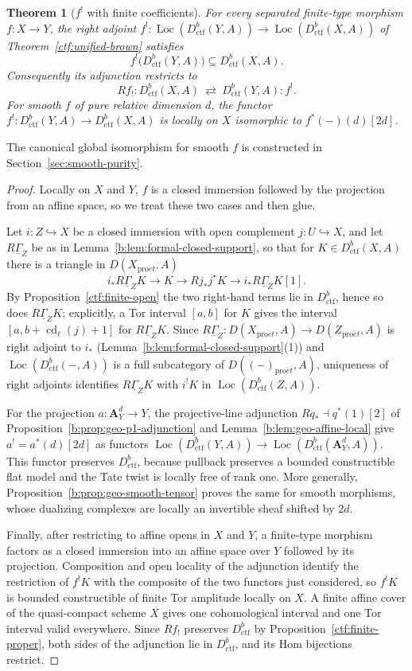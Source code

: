 \documentclass[11pt,a4paper]{article}
\numberwithin{equation}{section}
\newtheorem{theorem}{Theorem}[section]
\theoremstyle{definition}
\theoremstyle{remark}
\newcommand{\Loc}{\operatorname{Loc}}
\newcommand{\proet}{\mathrm{pro}\acute{e}t}
\newcommand{\Dctf}{D^b_{\mathrm{ctf}}}
\begin{document}
\begin{theorem}[$f^!$ with finite coefficients]
\label{ctf:finite-restriction}
For every separated finite-type morphism $f:X\to Y$, the right adjoint
$f^!\colon\Loc(\Dctf(Y,A))\to\Loc(\Dctf(X,A))$ of
Theorem~\ref{ctf:unified-brown} satisfies
\[
 f^!\bigl(\Dctf(Y,A)\bigr)\subseteq\Dctf(X,A).
\]
Consequently its adjunction restricts to
\[
 Rf_!:\Dctf(X,A)\ \rightleftarrows\ \Dctf(Y,A):f^!.
\]
For smooth $f$ of pure relative dimension $d$, the functor
$f^!\colon\Dctf(Y,A)\to\Dctf(X,A)$ is locally on $X$ isomorphic to
$f^*(-)(d)[2d]$.
\end{theorem}

The canonical global isomorphism for smooth $f$ is constructed in
Section~\ref{sec:smooth-purity}.

\begin{proof}
Locally on $X$ and $Y$, $f$ is a closed immersion followed by the
projection from an affine space, so we treat these two cases and then
glue.

Let $i:Z\hookrightarrow X$ be a closed immersion with open
complement $j:U\hookrightarrow X$, and let $R\underline\Gamma_Z$ be as in
Lemma~\ref{b:lem:formal-closed-support}, so that for
$K\in\Dctf(X,A)$ there is a triangle in $D(X_{\proet},A)$
\[
 i_*R\underline\Gamma_ZK\longrightarrow K\longrightarrow Rj_*j^*K
       \longrightarrow i_*R\underline\Gamma_ZK[1].
\]
By Proposition~\ref{ctf:finite-open} the two right-hand terms lie in
$\Dctf$, hence so does $R\underline\Gamma_ZK$; explicitly, a Tor interval
$[a,b]$ for $K$ gives the interval
$[a,b+\operatorname{cd}_\ell(j)+1]$ for $R\underline\Gamma_ZK$. Since
$R\underline\Gamma_Z\colon D(X_{\proet},A)\to D(Z_{\proet},A)$ is right
adjoint to $i_*$ (Lemma~\ref{b:lem:formal-closed-support}(1)) and
$\Loc(\Dctf(-,A))$ is a full subcategory of $D((-)_{\proet},A)$,
uniqueness of right adjoints identifies $R\underline\Gamma_ZK$ with
$i^!K$ in $\Loc(\Dctf(Z,A))$.

For the projection $a:\mathbf A^d_Y\to Y$, the projective-line
adjunction $Rq_*\dashv q^*(1)[2]$ of
Proposition~\ref{b:prop:geo-p1-adjunction} and Lemma~\ref{b:lem:geo-affine-local} give
$a^!=a^*(d)[2d]$ as functors
$\Loc(\Dctf(Y,A))\to\Loc(\Dctf(\mathbf A^d_Y,A))$. This functor preserves $\Dctf$, because pullback
preserves a bounded constructible flat model and the Tate twist is
locally free of rank one. More generally,
Proposition~\ref{b:prop:geo-smooth-tensor} proves the same for smooth
morphisms, whose dualizing complexes are locally an invertible sheaf
shifted by $2d$.

Finally, after restricting to affine opens in $X$ and $Y$, a
finite-type morphism factors as a closed immersion into an affine
space over $Y$ followed by its projection. Composition and open
locality of the adjunction identify the restriction of $f^!K$ with the
composite of the two functors just considered, so $f^!K$ is bounded
constructible of finite Tor amplitude locally on $X$. A finite affine
cover of the quasi-compact scheme $X$ gives one cohomological interval
and one Tor interval valid everywhere. Since $Rf_!$ preserves $\Dctf$ by
Proposition~\ref{ctf:finite-proper}, both sides of the adjunction lie
in $\Dctf$, and its Hom bijections restrict.
\end{proof}
\end{document}
